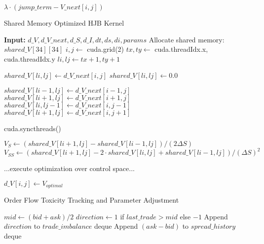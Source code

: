 \documentclass[twocolumn,ieee]{arithmaxresearch}
\begin{document}
\begin{onecolumn}
\begin{onecolumn}
\begin{algorithm}
\begin{algorithmic}[1]
    \State \Return $\lambda \cdot (jump\_term - V\_next[i,j])$ 
\EndFunction
\end{algorithmic}
\end{algorithm}


\begin{algorithm}
\caption{Shared Memory Optimized HJB Kernel}
\begin{algorithmic}[1]
\State \textbf{Input:} $d\_V, d\_V\_next, d\_S, d\_I, dt, ds, di, params$
\State Allocate shared memory: $shared\_V[34][34]$ 
\State $i, j \gets$ cuda.grid(2)
\State $tx, ty \gets$ cuda.threadIdx.x, cuda.threadIdx.y
\State $li, lj \gets tx + 1, ty + 1$ 

\State {}
    \State $shared\_V[li, lj] \gets d\_V\_next[i, j]$
\Else
    \State $shared\_V[li, lj] \gets 0.0$
\EndIf

\State {}
 
    \State $shared\_V[li-1, lj] \gets d\_V\_next[i-1, j]$
\EndIf
{} 
    \State $shared\_V[li+1, lj] \gets d\_V\_next[i+1, j]$
\EndIf
{} 
    \State $shared\_V[li, lj-1] \gets d\_V\_next[i, j-1]$
\EndIf
{} 
    \State $shared\_V[li+1, lj] \gets d\_V\_next[i, j+1]$
\EndIf

\State cuda.syncthreads() 

    \State {}
    \State $V_S \gets (shared\_V[li+1, lj] - shared\_V[li-1, lj])/(2\Delta S)$
    \State $V_{SS} \gets (shared\_V[li+1, lj] - 2 \cdot shared\_V[li, lj] + shared\_V[li-1, lj])/(\Delta S)^2$
    
    \State {}
    \State ...execute optimization over control space...
    
    \State $d\_V[i, j] \gets V_{optimal}$
\EndIf
\end{algorithmic}
\end{algorithm}


\begin{algorithm}
\caption{Order Flow Toxicity Tracking and Parameter Adjustment}
\begin{algorithmic}[1]
    \State $mid \gets (bid + ask)/2$
    \State $direction \gets 1$ if $last\_trade > mid$ else $-1$
    \State Append $direction$ to $trade\_imbalance$ deque
    \State Append $(ask - bid)$ to $spread\_history$ deque
\EndFunction


\end{algorithmic}
\end{algorithm}
\end{onecolumn}
\end{onecolumn}
\end{document}

